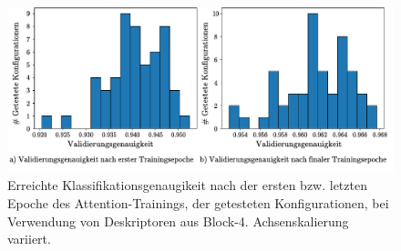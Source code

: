 \begin{figure}[h]
\includegraphics[scale=0.75]{NNOPT/Anhang/layer4_int_and_end_perf_attention.pdf}
\caption{Erreichte Klassifikationsgenaugikeit nach der ersten bzw. letzten Epoche des Attention-Trainings, der getesteten Konfigurationen, bei Verwendung von Deskriptoren aus \mbox{Block-4}. Achsenskalierung variiert.}
\label{hyperopt_layer4_1}
\end{figure}

